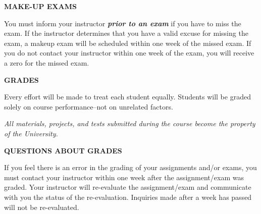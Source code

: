 \documentclass[12pt]{letter}
\newcommand{\customhref}[2]{
	\href{#1}{\color{blue}\burl{#2}}	
}
\begin{document}

\textbf{MAKE-UP EXAMS} \par
You must inform your instructor \textit{\textbf{prior to an exam}} if you have to miss the exam. If the instructor determines that you have a valid excuse for missing the exam, a makeup exam will be scheduled within one week of the missed exam. If you do not contact your instructor within one week of the exam, you will receive a zero for the missed exam.

\textbf{GRADES} \par
Every effort will be made to treat each student equally. Students will be graded solely on course performance--not on unrelated factors.

\par \textit{All materials, projects, and tests submitted during the course become the property of the University.}

\textbf{QUESTIONS ABOUT GRADES} \par
If you feel there is an error in the grading of your assignments and/or exams, you must contact your instructor within one week after the assignment/exam was graded. Your instructor will re-evaluate the assignment/exam and communicate with you the status of the re-evaluation. Inquiries made after a week has passed will not be re-evaluated.
\end{document}

